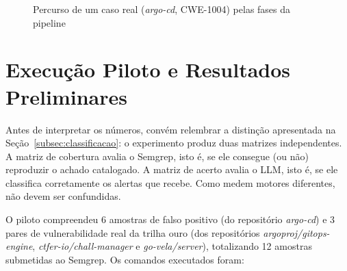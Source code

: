 \begin{figure}[htpb]
    \centering
    \caption{Percurso de um caso real (\textit{argo-cd}, CWE-1004) pelas fases da pipeline}
    \label{fig:exemplo}
    \fonteautores
\end{figure}

\section{Execução Piloto e Resultados Preliminares}

Antes de interpretar os números, convém relembrar a distinção apresentada na Seção~\ref{subsec:classificacao}: o experimento produz duas matrizes independentes. A matriz de cobertura avalia o Semgrep, isto é, se ele consegue (ou não) reproduzir o achado catalogado. A matriz de acerto avalia o LLM, isto é, se ele classifica corretamente os alertas que recebe. Como medem motores diferentes, não devem ser confundidas.

O piloto compreendeu 6 amostras de falso positivo (do repositório \textit{argo-cd}) e 3 pares de vulnerabilidade real da trilha ouro (dos repositórios \textit{argoproj/gitops-engine}, \textit{ctfer-io/chall-manager} e \textit{go-vela/server}), totalizando 12 amostras submetidas ao Semgrep. Os comandos executados foram:

